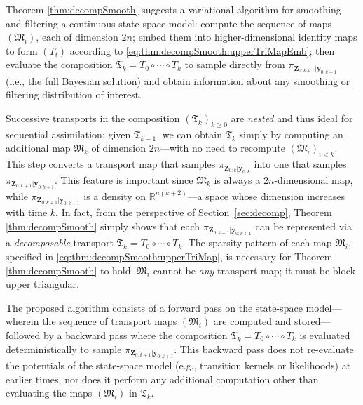 \documentclass[twoside,11pt]{article}
\newcommand{\re}{\mathbb{R}}
\newcommand{\yb}{\boldsymbol{y}}
\newcommand{\Zb}{\boldsymbol{Z}}
\newcommand{\submap}{\mathfrak{M}}
\begin{document}
%
Theorem \ref{thm:decompSmooth} suggests a variational %
algorithm for smoothing and filtering a continuous state-space
model: compute the sequence of maps $(\submap_i)$, each of dimension
$2n$; embed them into higher-dimensional identity maps to form $(T_i)$
according to \eqref{eq:thm:decompSmooth:upperTriMapEmb}; 
%
%
then evaluate
the composition $\mathfrak{T}_k = T_0 \circ \cdots \circ T_k$ to
sample directly from $\pi_{\Zb_{0:k+1} \vert \yb_{0:k+1} }$ (i.e.,
the full Bayesian solution) and obtain information about any
smoothing or filtering distribution of interest.
%
%
%
%
%
%
%
%
%
%
%
%
%

Successive transports in the composition $(\mathfrak{T}_k)_{k \ge 0}$ are 
{\it nested} and thus
ideal for sequential assimilation:
%
%
given $\mathfrak{T}_{k-1}$, we can 
%
obtain
$\mathfrak{T}_{k}$ simply by computing an additional map $\submap_{k}$
of dimension $2n$---with no need
to recompute $(\submap_i)_{i < k}$. This step converts a transport map that samples $\pi_{\Zb_{0:k}\vert \yb_{0:k}}$ into
one
%
that samples 
%
$\pi_{\Zb_{0:k+1}\vert \yb_{0:k+1}}$.
This
feature is important since $\submap_{k}$ is always a $2n$-dimensional map, while
$\pi_{\Zb_{0:k+1}\vert \yb_{0:k+1}}$ is a density
on $\re^{n(k+2)}$---a space whose dimension increases with time $k$.
%
%
%
%
In fact, from the perspective of Section~\ref{sec:decomp}, Theorem
\ref{thm:decompSmooth} simply shows that each
$\pi_{\Zb_{0:k+1}\vert \yb_{0:k+1}}$ can be represented via a
\emph{decomposable} transport $\mathfrak{T}_k = T_0 \circ \cdots \circ T_k$.
%
%
%
%
%
%
%
%
The sparsity pattern of each map $\submap_i$, specified  in 
\eqref{eq:thm:decompSmooth:upperTriMap}, is necessary for Theorem \ref{thm:decompSmooth} 
to hold: $\submap_i$ cannot be {\it any} transport map; it must be
block upper triangular.

%
%
%
The proposed algorithm consists of a forward pass on the state-space model---wherein the sequence of transport maps $(\submap_i)$ are computed and stored---followed by
a backward pass where the composition %
$\mathfrak{T}_k = T_0 \circ \cdots \circ T_k$ is %
evaluated deterministically  to sample $\pi_{\Zb_{0:k+1} \vert
  \yb_{0:k+1}}$. %
This backward pass does not re-evaluate the potentials of the
state-space model (e.g., transition kernels or likelihoods) at earlier
times, nor does it perform any
additional
computation other than evaluating the maps $(\submap_i)$ in $\mathfrak{T}_k$.
%
%
%
%
%
%
%
%
%
%
%
%
%
%
%
%
%
%
%
%
%
%
%
%
%
%
%
%
%
%
%
%
%
%
%
%
%
\end{document}
